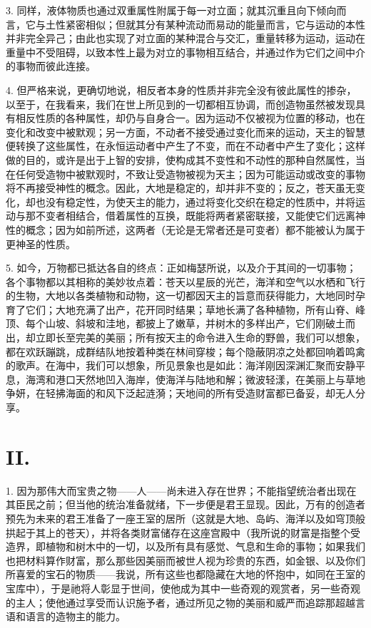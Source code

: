 3. 同样，液体物质也通过双重属性附属于每一对立面；就其沉重且向下倾向而言，它与土性紧密相似；但就其分有某种流动而易动的能量而言，它与运动的本性并非完全异己；由此也实现了对立面的某种混合与交汇，重量转移为运动，运动在重量中不受阻碍，以致本性上最为对立的事物相互结合，并通过作为它们之间中介的事物而彼此连接。\par

4. 但严格来说，更确切地说，相反者本身的性质并非完全没有彼此属性的掺杂，以至于，在我看来，我们在世上所见到的一切都相互协调，而创造物虽然被发现具有相反性质的各种属性，却仍与自身合一。因为运动不仅被视为位置的移动，也在变化和改变中被默观；另一方面，不动者不接受通过变化而来的运动，天主的智慧便转换了这些属性，在永恒运动者中产生了不变，而在不动者中产生了变化；这样做的目的，或许是出于上智的安排，使构成其不变性和不动性的那种自然属性，当在任何受造物中被默观时，不致让受造物被视为天主；因为可能运动或改变的事物将不再接受神性的概念。因此，大地是稳定的，却并非不变的；反之，苍天虽无变化，却也没有稳定性，为使天主的能力，通过将变化交织在稳定的性质中，并将运动与那不变者相结合，借着属性的互换，既能将两者紧密联接，又能使它们远离神性的概念；因为如前所述，这两者（无论是无常者还是可变者）都不能被认为属于更神圣的性质。\par

5. 如今，万物都已抵达各自的终点：正如梅瑟所说，以及介于其间的一切事物；各个事物都以其相称的美妙妆点着：苍天以星辰的光芒，海洋和空气以水栖和飞行的生物，大地以各类植物和动物，这一切都因天主的旨意而获得能力，大地同时孕育了它们；大地充满了出产，花开同时结果；草地长满了各种植物，所有山脊、峰顶、每个山坡、斜坡和洼地，都披上了嫩草，并树木的多样出产，它们刚破土而出，却立即长至完美的美丽；所有按天主的命令进入生命的野兽，我们可以想象，都在欢跃蹦跳，成群结队地按着种类在林间穿梭；每个隐蔽阴凉之处都回响着鸣禽的歌声。在海中，我们可以想象，所见景象也是如此：海洋刚因深渊汇聚而安静平息，海湾和港口天然地凹入海岸，使海洋与陆地和解；微波轻漾，在美丽上与草地争妍，在轻拂海面的和风下泛起涟漪；天地间的所有受造财富都已备妥，却无人分享。\par


\section{II. }

1. 因为那伟大而宝贵之物——人——尚未进入存在世界；不能指望统治者出现在其臣民之前；但当他的统治准备就绪，下一步便是君王显现。因此，万有的创造者预先为未来的君王准备了一座王室的居所（这就是大地、岛屿、海洋以及如穹顶般拱起于其上的苍天），并将各类财富储存在这座宫殿中（我所说的财富是指整个受造界，即植物和树木中的一切，以及所有具有感觉、气息和生命的事物；如果我们也把材料算作财富，那么那些因美丽而被世人视为珍贵的东西，如金银、以及你们所喜爱的宝石的物质——我说，所有这些也都隐藏在大地的怀抱中，如同在王室的宝库中），于是祂将人彰显于世间，使他成为其中一些奇观的观赏者，另一些奇观的主人；使他通过享受而认识施予者，通过所见之物的美丽和威严而追踪那超越言语和语言的造物主的能力。\par

